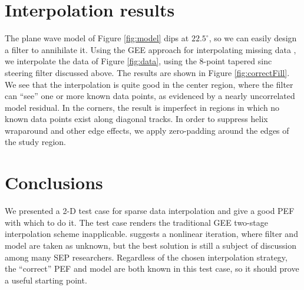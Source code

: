 
\section{ Interpolation results}

	The plane wave model of Figure \ref{fig:model} dips at $22.5^{\circ}$, so we can easily design a 
	filter to annihilate it.  Using the GEE approach for interpolating missing data \cite{gee}, we 
	interpolate the data of Figure \ref{fig:data}, using the 8-point tapered sinc steering filter
	discussed above.  The results are shown in Figure \ref{fig:correctFill}.  We see that the 
	interpolation is quite good in the center region, where the filter can ``see'' one or more known 
	data points, as evidenced by a nearly uncorrelated model residual.  In the corners, the result 
	is imperfect 
	in regions in which no known data points exist along diagonal tracks.  In order to suppress 
	helix wraparound and other edge effects, we apply zero-padding around the edges of the study 
	region. 


\section{ Conclusions }

	We presented a 2-D test case for sparse data interpolation and give a good PEF with which to do it.
	The test case renders the traditional GEE two-stage interpolation scheme inapplicable.
	 suggests a nonlinear iteration, where filter and model 
	are taken as unknown, but the best solution is still a subject of discussion among many SEP
	researchers.  Regardless of the chosen interpolation strategy, the ``correct'' PEF 
	and model are both known in this test case, so it should prove a useful starting point.

 
 
